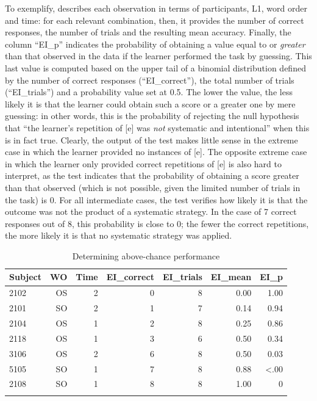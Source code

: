 To exemplify,  describes each observation in terms of participants, L1, word order and time: for each relevant combination, then, it provides the number of correct responses, the number of trials and the resulting mean accuracy. Finally, the column “EI\_p” indicates the probability of obtaining a value equal to or \textit{greater} than that observed in the data if the learner performed the task by guessing. This last value is computed based on the upper tail of a binomial distribution defined by the number of correct responses (“EI\_correct”), the total number of trials (“EI\_trials”) and a probability value set at 0.5. The lower the value, the less likely it is that the learner could obtain such a score or a greater one by mere guessing: in other words, this is the probability of rejecting the null hypothesis that “the learner’s repetition of [e] was \textit{not} systematic and intentional” when this is in fact true. Clearly, the output of the test makes little sense in the extreme case in which the learner provided no instances of [e]. The opposite extreme case in which the learner only provided correct repetitions of [e] is also hard to interpret, as the test indicates that the probability of obtaining a score greater than that observed (which is not possible, given the limited number of trials in the task) is 0. For all intermediate cases, the test verifies how likely it is that the outcome was not the product of a systematic strategy. In the case of 7 correct responses out of 8, this probability is close to 0; the fewer the correct repetitions, the more likely it is that no systematic strategy was applied.

\begin{table}
    \begin{tabularx}{\textwidth}{Xrrrrrr}
    \lsptoprule
     Subject & WO & Time & EI\_correct & EI\_trials & EI\_mean & EI\_p\\
     \midrule
     2102 & OS & 2 & 0 & 8 & 0.00 & 1.00\\
     2101 & SO & 2 & 1 & 7 & 0.14 & 0.94\\
     2104 & OS & 1 & 2 & 8 & 0.25 & 0.86\\
     2118 & OS & 1 & 3 & 6 & 0.50 & 0.34\\
     3106 & OS & 2 & 6 & 8 & 0.50 & 0.03\\
     5105 & SO & 1 & 7 & 8 & 0.88 & <.00\\
     2108 & SO & 1 & 8 & 8 & 1.00 & 0\\
    \lspbottomrule
    \end{tabularx}
    \caption{Determining above-chance performance}
    \label{tab:04:6}
\end{table}

